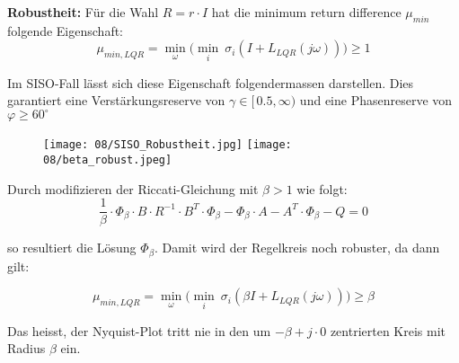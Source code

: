         \textbf{Robustheit:}
        Für die Wahl $R=r\cdot I$ hat die minimum return difference $\mu_{min}$ folgende Eigenschaft:\[\mu_{min,LQR} = \min_{\omega}\Big(\min_{i}\ \sigma_i(I+L_{LQR}(j\omega))\Big) \geq 1 \]
        
        Im SISO-Fall lässt sich diese Eigenschaft folgendermassen darstellen.
        Dies garantiert eine Verstärkungsreserve von $\gamma \in [\,0.5, \infty)$ und eine Phasenreserve von $\varphi \geq 60^\circ$
        
        \begin{figure}[H]
            \centering
            \texttt{[image: 08/SISO\_Robustheit.jpg]}
            \texttt{[image: 08/beta\_robust.jpeg]} 
        \end{figure}
    
        Durch modifizieren der Riccati-Gleichung mit $\beta > 1$ wie folgt:
        \[\frac{1}{\beta}\cdot\Phi_\beta\cdot B\cdot R^{-1}\cdot B^T\cdot \Phi_\beta - \Phi_\beta \cdot A - A^T\cdot \Phi_\beta-Q = 0\]
        
        so resultiert die Lösung $\Phi_\beta$. Damit wird der Regelkreis noch robuster, da dann gilt: 
        
        \[\mu_{min,LQR}=\min_\omega\Big(\min_{i}\ \sigma_i(\beta I+L_{LQR}(j\omega))\Big) \geq \beta \]
        
        Das heisst, der Nyquist-Plot tritt nie in den um $-\beta +j\cdot0$ zentrierten Kreis mit Radius $\beta$ ein.
        